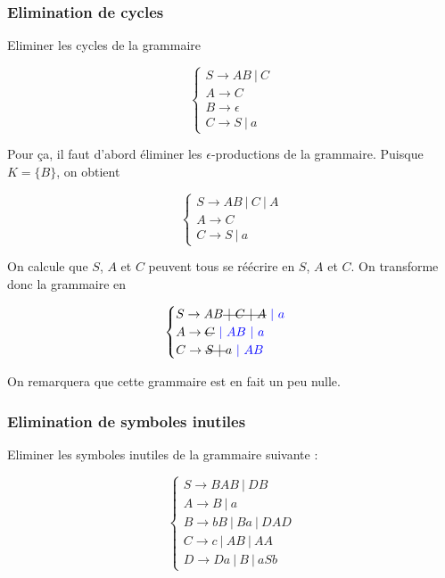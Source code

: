 \subsubsection{Elimination de cycles}


\begin{exercice}
Eliminer les cycles de la grammaire 

\[
\begin{cases}
S \rightarrow AB~|~C\\
A \rightarrow C \\
B \rightarrow \epsilon \\
C \rightarrow S~|~a 
\end{cases}
\]
\end{exercice}

\begin{correction*}

Pour ça, il faut d'abord éliminer les $\epsilon$-productions de la grammaire. Puisque $K = \{B\}$, on obtient

\[
\begin{cases}
S \rightarrow AB~|~C~|~A\\
A \rightarrow C \\
C \rightarrow S~|~a 
\end{cases}
\]

On calcule que $S$, $A$ et $C$ peuvent tous se réécrire en $S$, $A$ et $C$. On transforme donc la grammaire en 

\[
\begin{cases}
S \rightarrow AB\text{\st{$~|~C~|~A$}}\textcolor{blue}{~|~a}\\
A \rightarrow \text{\st{$C$}}\textcolor{blue}{~|~AB~|~a}\\
C \rightarrow \text{\st{$S~|~$}}a\textcolor{blue}{~|~AB} 
\end{cases}
\]

On remarquera que cette grammaire est en fait un peu nulle.

\end{correction*}

\subsubsection{Elimination de symboles inutiles}

\begin{exercice}
Eliminer les symboles inutiles de la grammaire suivante :

\[
\begin{cases}
S \rightarrow BAB~|~DB \\
A \rightarrow B~|~a \\
B \rightarrow bB~|~Ba~|~DAD \\
C \rightarrow c~|~AB~|~AA \\
D \rightarrow Da~|~B~|~aSb
\end{cases}
\]

\end{exercice}

